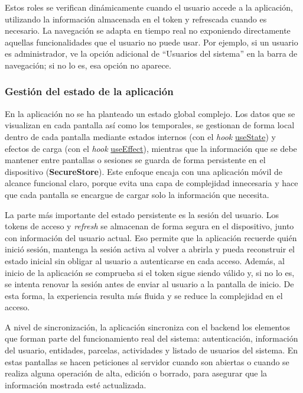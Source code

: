 Estos roles se verifican dinámicamente cuando el usuario accede a la aplicación, utilizando la información almacenada en el token y refrescada cuando es necesario. La navegación se adapta en tiempo real no exponiendo directamente
aquellas funcionalidades que el usuario no puede usar. Por ejemplo, si un usuario es administrador, ve la opción adicional de ``Usuarios del sistema'' en la barra de navegación; si no lo es, esa opción no aparece.

\subsubsection{Gestión del estado de la aplicación}

En la aplicación no se ha planteado un estado global complejo. Los datos que se visualizan en cada pantalla así como los temporales, se gestionan de forma local dentro de cada pantalla mediante estados internos (con el 
\textit{hook} \hyperlink{useState}{useState}) y efectos de carga (con el \textit{hook} \hyperlink{useEffect}{useEffect}), mientras que la información que se debe mantener entre pantallas o sesiones se guarda de forma persistente en el dispositivo (\textbf{SecureStore}). Este
enfoque encaja con una aplicación móvil de alcance funcional claro, porque evita una capa de complejidad innecesaria y hace que cada pantalla se encargue de cargar solo la información que necesita.

La parte más importante del estado persistente es la sesión del usuario. Los tokens de acceso y \textit{refresh} se almacenan de forma segura en el dispositivo, junto con información del usuario actual. Eso permite que la aplicación 
recuerde quién inició sesión, mantenga la sesión activa al volver a abrirla y pueda reconstruir el estado inicial sin obligar al usuario a autenticarse en cada acceso. Además, al inicio de la aplicación se comprueba si el token 
sigue siendo válido y, si no lo es, se intenta renovar la sesión antes de enviar al usuario a la pantalla de inicio. De esta forma, la experiencia resulta más fluida y se reduce la complejidad en el acceso.

A nivel de sincronización, la aplicación sincroniza con el backend los elementos que forman parte del funcionamiento real del sistema: autenticación, información del usuario, entidades, parcelas, actividades y listado de usuarios del 
sistema. En estas pantallas se hacen peticiones al servidor cuando son abiertas o cuando se realiza alguna operación de alta, edición o borrado, para asegurar que la información mostrada esté actualizada. 

